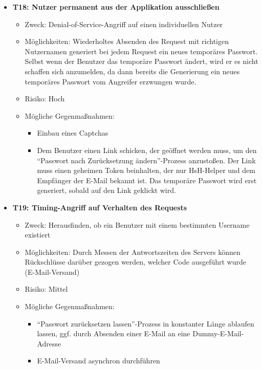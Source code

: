 \documentclass[12pt,DIV14,BCOR10mm,a4paper,parskip=half-,headsepline,headinclude,english,ngerman,bibliography=totocnumbered]{scrreprt}
\begin{document}
\begin{itemize}
  \hypertarget{threat18}{}
  \item \textbf{T18: Nutzer permanent aus der Applikation ausschließen}
  \begin{itemize}
  \item Zweck: Denial-of-Service-Angriff auf einen individuellen Nutzer
  \item Möglichkeiten: Wiederholtes Absenden des Request mit richtigen Nutzernamen generiert bei jedem Request ein neues temporäres Passwort. Selbst wenn der Benutzer das temporäre Passwort ändert, wird er es nicht schaffen sich anzumelden, da dann bereits die Generierung ein neues temporäres Passwort vom Angreifer erzwungen wurde.
  \item Risiko: Hoch
  \item Mögliche Gegenmaßnahmen:
  \begin{itemize}
  \item Einbau eines Captchas
  \item Dem Benutzer einen Link schicken, der geöffnet werden muss, um den \enquote{Passwort nach Zurücksetzung ändern}-Prozess anzustoßen. Der Link muss einen geheimen Token beinhalten, der nur HsH-Helper und dem Empfänger der E-Mail bekannt ist. Das temporäre Passwort wird erst generiert, sobald auf den Link geklickt wird.
  \end{itemize}
\end{itemize}

  \hypertarget{threat19}{}
  \item \textbf{T19: Timing-Angriff auf Verhalten des Requests}
  \begin{itemize}
  \item Zweck: Herausfinden, ob ein Benutzer mit einem bestimmten Username existiert
  \item Möglichkeiten: Durch Messen der Antwortszeiten des Servers können Rück\-schlüsse darüber gezogen werden, welcher Code ausgeführt wurde (E-Mail-Versand)
  \item Risiko: Mittel
  \item Mögliche Gegenmaßnahmen:
  \begin{itemize}
    \item \enquote{Passwort zurücksetzen lassen}-Prozess in konstanter Länge ablaufen lassen, ggf. durch Absenden einer E-Mail an eine Dummy-E-Mail-Adresse
    \item E-Mail-Versand asynchron durchführen
    \end{itemize}
  \end{itemize}


\end{itemize}
\end{document}
